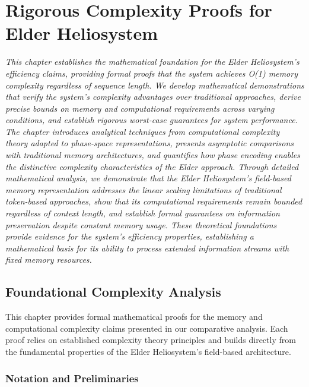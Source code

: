 \chapter{Rigorous Complexity Proofs for Elder Heliosystem}

\textit{This chapter establishes the mathematical foundation for the Elder Heliosystem's efficiency claims, providing formal proofs that the system achieves O(1) memory complexity regardless of sequence length. We develop mathematical demonstrations that verify the system's complexity advantages over traditional approaches, derive precise bounds on memory and computational requirements across varying conditions, and establish rigorous worst-case guarantees for system performance. The chapter introduces analytical techniques from computational complexity theory adapted to phase-space representations, presents asymptotic comparisons with traditional memory architectures, and quantifies how phase encoding enables the distinctive complexity characteristics of the Elder approach. Through detailed mathematical analysis, we demonstrate that the Elder Heliosystem's field-based memory representation addresses the linear scaling limitations of traditional token-based approaches, show that its computational requirements remain bounded regardless of context length, and establish formal guarantees on information preservation despite constant memory usage. These theoretical foundations provide evidence for the system's efficiency properties, establishing a mathematical basis for its ability to process extended information streams with fixed memory resources.}

\section{Foundational Complexity Analysis}

This chapter provides formal mathematical proofs for the memory and computational complexity claims presented in our comparative analysis. Each proof relies on established complexity theory principles and builds directly from the fundamental properties of the Elder Heliosystem's field-based architecture.

\subsection{Notation and Preliminaries}

